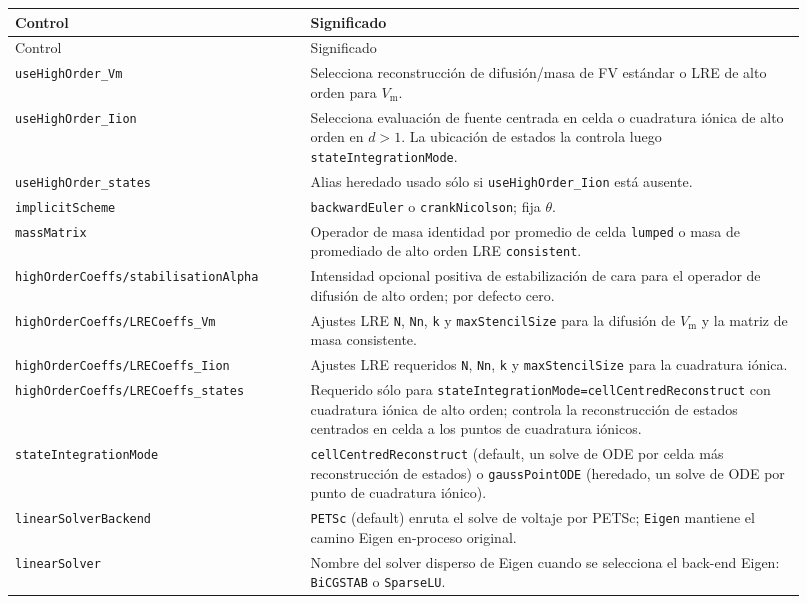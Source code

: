 \documentclass[11pt,a4paper]{article}
\newcommand{\code}[1]{\texttt{\small #1}}
\newcommand{\Vm}{V_{\text{m}}}
\begin{document}
\begin{longtable}{@{}p{0.34\linewidth}p{0.58\linewidth}@{}}
\toprule
Control & Significado \\
\midrule
\endfirsthead
\toprule
Control & Significado \\
\midrule
\endhead
\code{useHighOrder\_Vm} & Selecciona reconstrucción de difusión/masa de FV estándar o LRE de alto orden para $\Vm$. \\
\code{useHighOrder\_Iion} & Selecciona evaluación de fuente centrada en celda o cuadratura iónica de alto orden en $d>1$. La ubicación de estados la controla luego \code{stateIntegrationMode}. \\
\code{useHighOrder\_states} & Alias heredado usado sólo si \code{useHighOrder\_Iion} está ausente. \\
\code{implicitScheme} & \code{backwardEuler} o \code{crankNicolson}; fija $\theta$. \\
\code{massMatrix} & Operador de masa identidad por promedio de celda \code{lumped} o masa de promediado de alto orden LRE \code{consistent}. \\
\code{highOrderCoeffs/stabilisationAlpha} & Intensidad opcional positiva de estabilización de cara para el operador de difusión de alto orden; por defecto cero. \\
\code{highOrderCoeffs/LRECoeffs\_Vm} & Ajustes LRE \code{N}, \code{Nn}, \code{k} y \code{maxStencilSize} para la difusión de $\Vm$ y la matriz de masa consistente. \\
\code{highOrderCoeffs/LRECoeffs\_Iion} & Ajustes LRE requeridos \code{N}, \code{Nn}, \code{k} y \code{maxStencilSize} para la cuadratura iónica. \\
\code{highOrderCoeffs/LRECoeffs\_states} & Requerido sólo para \code{stateIntegrationMode=cellCentredReconstruct} con cuadratura iónica de alto orden; controla la reconstrucción de estados centrados en celda a los puntos de cuadratura iónicos. \\
\code{stateIntegrationMode} & \code{cellCentredReconstruct} (default, un solve de ODE por celda más reconstrucción de estados) o \code{gaussPointODE} (heredado, un solve de ODE por punto de cuadratura iónico). \\
\code{linearSolverBackend} & \code{PETSc} (default) enruta el solve de voltaje por PETSc; \code{Eigen} mantiene el camino Eigen en-proceso original. \\
\code{linearSolver} & Nombre del solver disperso de Eigen cuando se selecciona el back-end Eigen: \code{BiCGSTAB} o \code{SparseLU}. \\

\end{longtable}
\end{document}
